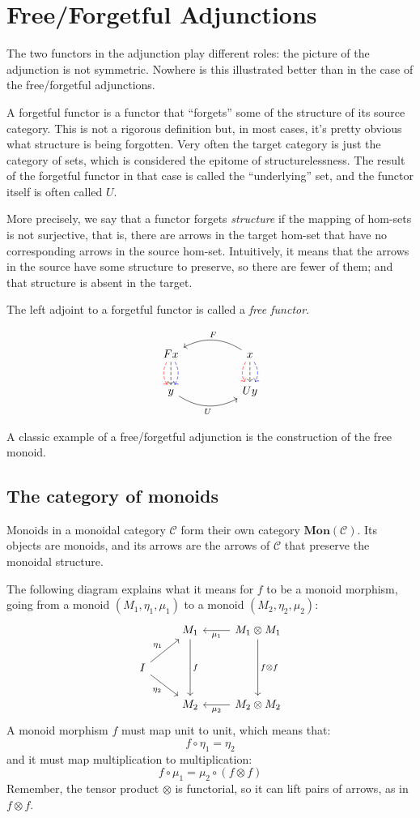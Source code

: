 \documentclass[DaoFP]{subfiles}
\begin{document}
\section{Free/Forgetful Adjunctions}
The two functors in the adjunction play different roles: the picture of the adjunction is not symmetric. Nowhere is this illustrated better than in the case of the free/forgetful adjunctions. 

A forgetful functor is a functor that ``forgets'' some of the structure of its source category. This is not a rigorous definition but, in most cases, it's pretty obvious what structure is being forgotten. Very often the target category is just the category of sets, which is considered the epitome of structurelessness. The result of the forgetful functor in that case is called the ``underlying'' set, and the functor itself is often called $U$. 

More precisely, we say that a functor forgets \emph{structure} if the mapping of hom-sets is not surjective, that is, there are arrows in the target hom-set that have no corresponding arrows in the source hom-set. Intuitively, it means that the arrows in the source have some structure to preserve, so there are fewer of them; and that structure is absent in the target. 

The left adjoint to a forgetful functor is called a \emph{free functor}.

\[
 \begin{tikzcd}
F x
\arrow[d, bend right, red, dashed]
\arrow[d, dashed]
\arrow[d, bend left, blue, dashed]
  &&
  x
\arrow[d, bend right, red, dashed]
\arrow[d, dashed]
\arrow[d, bend left, blue, dashed]
 \arrow[ll, bend right, "F"']
 \\
y
   \arrow[rr, bend right, "U"']
 &&
 U y
  \end{tikzcd}
\]

A classic example of a free/forgetful adjunction is the construction of the free monoid.


\subsection{The category of monoids}
Monoids in a monoidal category $\mathcal{C}$ form their own category $\mathbf{Mon}(\mathcal{C})$. Its objects are monoids, and its arrows are the arrows of $\mathcal{C}$ that preserve the monoidal structure. 

The following diagram explains what it means for $f$ to be a monoid morphism, going from a monoid $(M_1, \eta_1, \mu_1)$ to a monoid $(M_2, \eta_2, \mu_2)$:
\[
 \begin{tikzcd}
 & M_1
 \arrow[dd, "f"]
 & M_1 \otimes M_1
 \arrow[l, "\mu_1"]
 \arrow[dd, "f \otimes f"]
 \\
 I
 \arrow[ru, "\eta_1"]
 \arrow[rd, "\eta_2"']
 \\
 & M_2
 & M_2 \otimes M_2
 \arrow[l, "\mu_2"]
  \end{tikzcd}
\]
A monoid morphism $f$ must map unit to unit, which means that:
\[ f \circ \eta_1 = \eta_2 \]
and it must map multiplication to multiplication:
\[ f \circ \mu_1 = \mu_2 \circ (f \otimes f)\]
Remember, the tensor product $\otimes$ is functorial, so it can lift pairs of arrows, as in $f \otimes f$.
\end{document}
